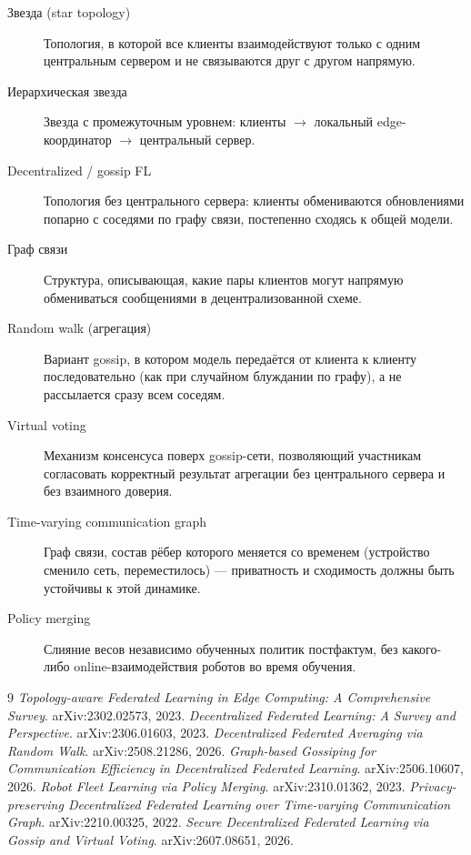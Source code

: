\documentclass[11pt]{article}
\begin{document}
\begin{description}
  \item[Звезда (star topology)] Топология, в которой все клиенты взаимодействуют
    только с одним центральным сервером и не связываются друг с другом напрямую.
  \item[Иерархическая звезда] Звезда с промежуточным уровнем: клиенты $\to$
    локальный edge-координатор $\to$ центральный сервер.
  \item[Decentralized / gossip FL] Топология без центрального сервера: клиенты
    обмениваются обновлениями попарно с соседями по графу связи, постепенно
    сходясь к общей модели.
  \item[Граф связи] Структура, описывающая, какие пары клиентов могут напрямую
    обмениваться сообщениями в децентрализованной схеме.
  \item[Random walk (агрегация)] Вариант gossip, в котором модель передаётся от
    клиента к клиенту последовательно (как при случайном блуждании по графу), а не
    рассылается сразу всем соседям.
  \item[Virtual voting] Механизм консенсуса поверх gossip-сети, позволяющий
    участникам согласовать корректный результат агрегации без центрального сервера
    и без взаимного доверия.
  \item[Time-varying communication graph] Граф связи, состав рёбер которого меняется
    со временем (устройство сменило сеть, переместилось) — приватность и сходимость
    должны быть устойчивы к этой динамике.
  \item[Policy merging] Слияние весов независимо обученных политик постфактум, без
    какого-либо online-взаимодействия роботов во время обучения.
\end{description}

\begin{thebibliography}{9}
 \emph{Topology-aware Federated Learning in Edge
  Computing: A Comprehensive Survey}. arXiv:2302.02573, 2023.
 \emph{Decentralized Federated Learning: A Survey
  and Perspective}. arXiv:2306.01603, 2023.
 \emph{Decentralized Federated Averaging via Random Walk}.
  arXiv:2508.21286, 2026.
 \emph{Graph-based Gossiping for Communication Efficiency
  in Decentralized Federated Learning}. arXiv:2506.10607, 2026.
 \emph{Robot Fleet Learning via Policy Merging}.
  arXiv:2310.01362, 2023.
 \emph{Privacy-preserving Decentralized Federated Learning
  over Time-varying Communication Graph}. arXiv:2210.00325, 2022.
 \emph{Secure Decentralized Federated Learning via Gossip
  and Virtual Voting}. arXiv:2607.08651, 2026.
\end{thebibliography}
\end{document}
